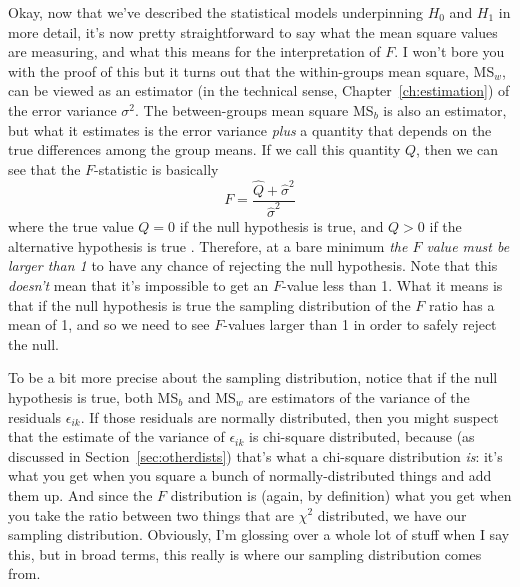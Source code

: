 \begin{mdframed}[style=MyFrame,nobreak=false]
Okay, now that we've described the statistical models underpinning $H_0$ and $H_1$ in more detail, it's now pretty straightforward to say what the mean square values are measuring, and what this means for the interpretation of $F$. I won't bore you with the proof of this but it turns out that the within-groups mean square, MS$_w$, can be viewed as an estimator (in the technical sense, Chapter~\ref{ch:estimation}) of the error variance $\sigma^2$. The between-groups mean square MS$_b$ is also an estimator, but what it estimates is the error variance {\it plus} a quantity that depends on the true differences among the group means. If we call this quantity $Q$, then we can see that the $F$-statistic is basically
$$
F = \frac{\hat{Q} + \hat\sigma^2}{\hat\sigma^2}
$$
where the true value $Q=0$ if the null hypothesis is true, and $Q > 0$ if the alternative hypothesis is true \parencite[e.g.,][ch.\ 10]{Hays1994}. Therefore, at a bare minimum {\it the $F$ value must be larger than 1} to have any chance of rejecting the null hypothesis. Note that this {\it doesn't} mean that it's impossible to get an $F$-value less than 1. What it means is that if the null hypothesis is true the sampling distribution of the $F$ ratio has a mean of 1, and so we need to see $F$-values larger than 1 in order to safely reject the null.

To be a bit more precise about the sampling distribution, notice that if the null hypothesis is true, both MS$_b$ and MS$_w$ are estimators of the variance of the residuals $\epsilon_{ik}$. If those residuals are normally distributed, then you might suspect that the estimate of the variance of $\epsilon_{ik}$ is chi-square distributed, because (as discussed in Section~\ref{sec:otherdists}) that's what a chi-square distribution {\it is}: it's what you get when you square a bunch of normally-distributed things and add them up. And since the $F$ distribution is (again, by definition) what you get when you take the ratio between two things that are $\chi^2$ distributed, we have our sampling distribution. Obviously, I'm glossing over a whole lot of stuff when I say this, but in broad terms, this really is where our sampling distribution comes from. %
\end{mdframed}

